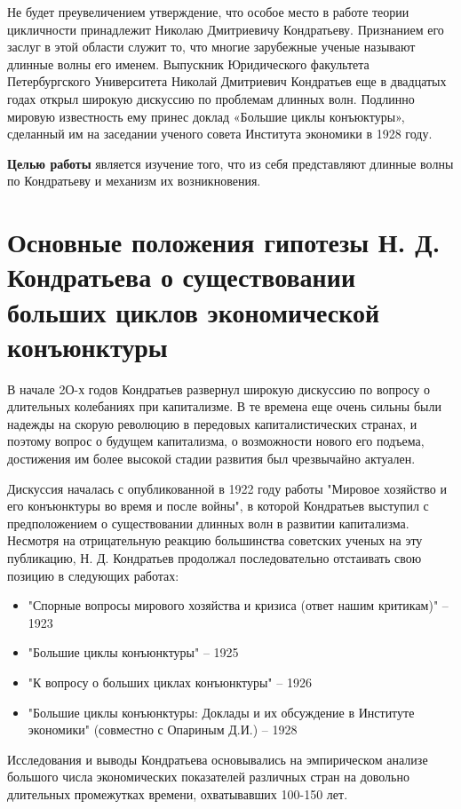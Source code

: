 \documentclass[a4paper,14pt]{extarticle}
\begin{document}
 	Не будет преувеличением утверждение, что особое место в работе теории цикличности принадлежит Николаю Дмитриевичу Кондратьеву. Признанием его заслуг в этой области служит то, что многие зарубежные ученые называют длинные волны его именем. Выпускник Юридического факультета Петербургского Университета Николай Дмитриевич Кондратьев еще в двадцатых годах открыл широкую дискуссию по проблемам длинных волн. Подлинно мировую известность ему принес доклад «Большие циклы конъюктуры», сделанный им на заседании ученого совета Института экономики в 1928 году.
 	
 	\textbf{Целью работы} является изучение того, что из себя представляют длинные волны по Кондратьеву и механизм их возникновения.
 	
 	\section{Основные положения гипотезы Н. Д. Кондратьева о существовании больших циклов экономической конъюнктуры}
 	
 	В начале 2О-х годов Кондратьев развернул широкую дискуссию по вопросу о длительных колебаниях при капитализме. В те времена еще очень сильны были надежды на скорую революцию в передовых капиталистических странах, и поэтому вопрос о будущем капитализма, о возможности нового его подъема, достижения им более высокой стадии развития был чрезвычайно актуален.
 	
 	Дискуссия началась с опубликованной в 1922 году работы "Мировое хозяйство и его конъюнктуры во время и после войны", в которой Кондратьев выступил с предположением о существовании длинных волн в развитии капитализма. Несмотря на отрицательную реакцию большинства советских ученых на эту публикацию, Н. Д. Кондратьев продолжал последовательно отстаивать свою позицию в следующих работах:
 	\begin{itemize}
 		\item "Спорные вопросы мирового хозяйства и кризиса (ответ нашим
 		критикам)" – 1923
 		\item "Большие циклы конъюнктуры" – 1925
 		\item "К вопросу о больших циклах конъюнктуры" – 1926
 		\item "Большие циклы конъюнктуры: Доклады и их обсуждение в Институте экономики" (совместно с Опариным Д.И.) – 1928
 	\end{itemize}
 	
 	Исследования и выводы Кондратьева основывались на эмпирическом анализе большого числа экономических показателей различных стран на довольно длительных промежутках времени, охватывавших 100-150 лет.
 	
\end{document}
